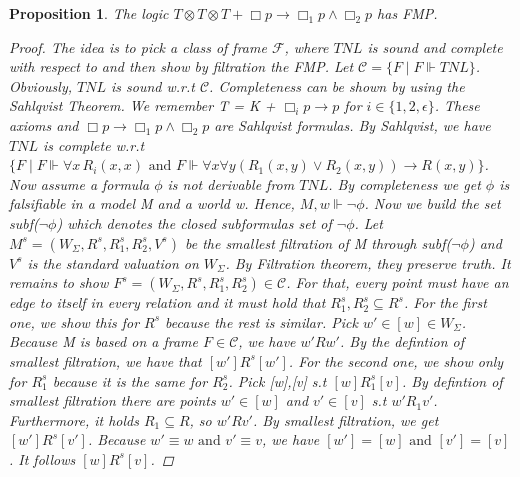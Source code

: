 \documentclass[12pt, a4paper]{scrartcl}
\newtheorem{proposition}[definition]{Proposition}
\begin{document}
\begin{proposition}
    The logic $T \otimes T \otimes T + \Box p \rightarrow \Box_1 p \land \Box_2 p$ has FMP.
    \begin{proof}
    The idea is to pick a class of frame $\mathcal{F}$, where $\mathit{TNL}$ is sound and complete with respect to and then show by filtration the FMP. \newline \newline
    Let $\mathcal{C} = \{F \mid F \Vdash \mathit{TNL}\}$. Obviously,  $\mathit{TNL}$ is sound w.r.t $\mathcal{C}$. Completeness can be shown by using the Sahlqvist Theorem.
    We remember T = K + $\Box_i p \rightarrow p$ for $i \in \{1,2, \epsilon\}$. These axioms and $\Box p \rightarrow \Box_1 p \land \Box_2 p$ are Sahlqvist formulas. 
    By Sahlqvist, we have $\mathit{TNL}$ is complete w.r.t $\{F \mid F \Vdash \forall x \, R_i(x,x) \mbox{ and } F \Vdash \forall x \forall y (R_1(x,y) \lor R_2(x,y)) \rightarrow R(x,y)\}$. \newline \newline
    Now assume a formula $\phi$ is not derivable from $\mathit{TNL}$. By completeness we get $\phi$ is falsifiable in a model M and a world w. Hence, $M,w \Vdash \neg \phi$. Now we build the set subf($\neg \phi$) which denotes the closed subformulas set of $\neg \phi$.
    Let $M^s = (W_\Sigma, R^s, R^s_1, R^s_2, V^s)$ be the smallest filtration of M through subf($\neg \phi$) and $V^s$ is the standard valuation on $W_\Sigma$. By Filtration theorem, they preserve truth.
    It remains to show $F^s = (W_\Sigma, R^s, R^s_1, R^s_2)\in  \mathcal{C}$. For that, every point must have an edge to itself in every relation and it must hold that $R^s_1,R^s_2 \subseteq R^s$. For the first one, we show this for $R^s$ because the rest is similar.
    Pick $w' \in [w]\in W_\Sigma$. Because M is based on a frame $F \in \mathcal{C}$, we have $w'Rw'$. By the defintion of smallest filtration, we have that $[w']R^s[w']$. For the second one, we show only for $R^s_1$ because it is the same for $R^s_2$.
    Pick [w],[v] s.t $[w]R^s_1[v]$. By defintion of smallest filtration there are points $w' \in [w]$ and $v' \in [v]$ s.t $w'R_1v'$. Furthermore, it holds $R_1 \subseteq R$, so $w'Rv'$.
    By smallest filtration, we get $[w']R^s[v']$. Because $w' \equiv w \mbox{ and } v' \equiv v$, we have $[w'] = [w] \mbox{ and } [v'] = [v]$. It follows $[w]R^s[v]$.
    
    \end{proof}
        
\end{proposition}
\end{document}
